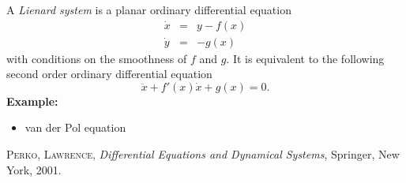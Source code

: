 \documentclass[12pt]{article}
\begin{document}

A \emph{Lienard system} is a planar ordinary differential equation
\begin{eqnarray*}
\dot{x} & = & y -f(x)\\
\dot{y} & = & -g(x)
\end{eqnarray*}
with conditions on the smoothness of $f$ and $g$.  It is equivalent 
to the following second order ordinary differential equation
$$\ddot{x}+f'(x)\dot{x}+g(x)=0.$$
\textbf{Example:}
\begin{itemize}
\item van der Pol equation
\end{itemize}

\begin{thebibliography}{1}
{\scshape Perko, Lawrence},
\emph{Differential Equations and Dynamical Systems},
Springer, New York, 2001.
\end{thebibliography}
\end{document}
